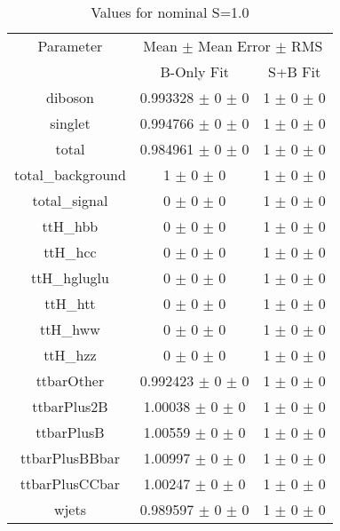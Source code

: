 \begin{table}
\centering
\caption{Values for nominal S=1.0}
\begin{tabular}{ccc}
\toprule
Parameter & \multicolumn{2}{c}{Mean $\pm$ Mean Error $\pm$ RMS}\\
 & B-Only Fit & S+B Fit\\
\midrule
diboson & \num{0.993328} $\pm$ \num{0} $\pm$ \num{0} & \num{1} $\pm$ \num{0} $\pm$ \num{0}\\
singlet & \num{0.994766} $\pm$ \num{0} $\pm$ \num{0} & \num{1} $\pm$ \num{0} $\pm$ \num{0}\\
total & \num{0.984961} $\pm$ \num{0} $\pm$ \num{0} & \num{1} $\pm$ \num{0} $\pm$ \num{0}\\
total\_background & \num{1} $\pm$ \num{0} $\pm$ \num{0} & \num{1} $\pm$ \num{0} $\pm$ \num{0}\\
total\_signal & \num{0} $\pm$ \num{0} $\pm$ \num{0} & \num{1} $\pm$ \num{0} $\pm$ \num{0}\\
ttH\_hbb & \num{0} $\pm$ \num{0} $\pm$ \num{0} & \num{1} $\pm$ \num{0} $\pm$ \num{0}\\
ttH\_hcc & \num{0} $\pm$ \num{0} $\pm$ \num{0} & \num{1} $\pm$ \num{0} $\pm$ \num{0}\\
ttH\_hgluglu & \num{0} $\pm$ \num{0} $\pm$ \num{0} & \num{1} $\pm$ \num{0} $\pm$ \num{0}\\
ttH\_htt & \num{0} $\pm$ \num{0} $\pm$ \num{0} & \num{1} $\pm$ \num{0} $\pm$ \num{0}\\
ttH\_hww & \num{0} $\pm$ \num{0} $\pm$ \num{0} & \num{1} $\pm$ \num{0} $\pm$ \num{0}\\
ttH\_hzz & \num{0} $\pm$ \num{0} $\pm$ \num{0} & \num{1} $\pm$ \num{0} $\pm$ \num{0}\\
ttbarOther & \num{0.992423} $\pm$ \num{0} $\pm$ \num{0} & \num{1} $\pm$ \num{0} $\pm$ \num{0}\\
ttbarPlus2B & \num{1.00038} $\pm$ \num{0} $\pm$ \num{0} & \num{1} $\pm$ \num{0} $\pm$ \num{0}\\
ttbarPlusB & \num{1.00559} $\pm$ \num{0} $\pm$ \num{0} & \num{1} $\pm$ \num{0} $\pm$ \num{0}\\
ttbarPlusBBbar & \num{1.00997} $\pm$ \num{0} $\pm$ \num{0} & \num{1} $\pm$ \num{0} $\pm$ \num{0}\\
ttbarPlusCCbar & \num{1.00247} $\pm$ \num{0} $\pm$ \num{0} & \num{1} $\pm$ \num{0} $\pm$ \num{0}\\
wjets & \num{0.989597} $\pm$ \num{0} $\pm$ \num{0} & \num{1} $\pm$ \num{0} $\pm$ \num{0}\\
\bottomrule
\end{tabular}
\end{table}